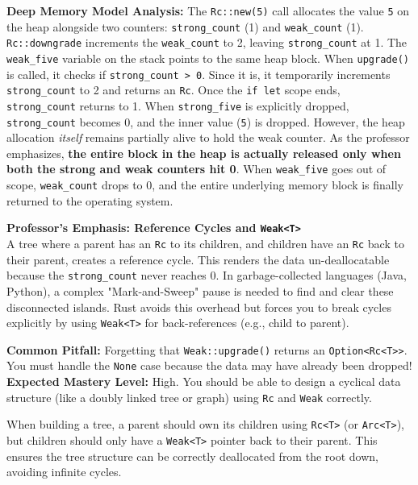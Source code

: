 \textbf{Deep Memory Model Analysis:} The \texttt{Rc::new(5)} call allocates the value \texttt{5} on the heap alongside two counters: \texttt{strong\_count} (1) and \texttt{weak\_count} (1). \texttt{Rc::downgrade} increments the \texttt{weak\_count} to 2, leaving \texttt{strong\_count} at 1. The \texttt{weak\_five} variable on the stack points to the same heap block. When \texttt{upgrade()} is called, it checks if \texttt{strong\_count > 0}. Since it is, it temporarily increments \texttt{strong\_count} to 2 and returns an \texttt{Rc}. Once the \texttt{if let} scope ends, \texttt{strong\_count} returns to 1. When \texttt{strong\_five} is explicitly dropped, \texttt{strong\_count} becomes 0, and the inner value (\texttt{5}) is dropped. However, the heap allocation \textit{itself} remains partially alive to hold the weak counter. As the professor emphasizes, \textbf{the entire block in the heap is actually released only when both the strong and weak counters hit 0}. When \texttt{weak\_five} goes out of scope, \texttt{weak\_count} drops to 0, and the entire underlying memory block is finally returned to the operating system.

\begin{examprioritybox}
\textbf{Professor's Emphasis: Reference Cycles and \texttt{Weak<T>}} \\
A tree where a parent has an \texttt{Rc} to its children, and children have an \texttt{Rc} back to their parent, creates a reference cycle. This renders the data un-deallocatable because the \texttt{strong\_count} never reaches 0. In garbage-collected languages (Java, Python), a complex "Mark-and-Sweep" pause is needed to find and clear these disconnected islands. Rust avoids this overhead but forces you to break cycles explicitly by using \texttt{Weak<T>} for back-references (e.g., child to parent). 

\textbf{Common Pitfall:} Forgetting that \texttt{Weak::upgrade()} returns an \texttt{Option<Rc<T>>}. You must handle the \texttt{None} case because the data may have already been dropped!
\textbf{Expected Mastery Level:} High. You should be able to design a cyclical data structure (like a doubly linked tree or graph) using \texttt{Rc} and \texttt{Weak} correctly.
\end{examprioritybox}

When building a tree, a parent should own its children using \texttt{Rc<T>} (or \texttt{Arc<T>}), but children should only have a \texttt{Weak<T>} pointer back to their parent. This ensures the tree structure can be correctly deallocated from the root down, avoiding infinite cycles.

